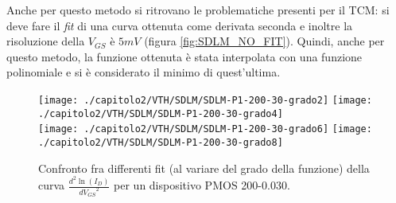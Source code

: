 Anche per questo metodo si ritrovano le problematiche presenti per il TCM: si deve fare il \textit{fit} di una curva ottenuta come derivata seconda e inoltre la risoluzione della $V_{GS}$ è $5mV$ (figura \ref{fig:SDLM_NO_FIT}).
Quindi, anche per questo metodo, la funzione ottenuta è stata interpolata con una funzione polinomiale e si è considerato il minimo di quest'ultima.

  \begin{figure}[ht]
    \centering
    \texttt{[image: ./capitolo2/VTH/SDLM/SDLM-P1-200-30-grado2]}
    \texttt{[image: ./capitolo2/VTH/SDLM/SDLM-P1-200-30-grado4]}\\
    \vspace{0.2cm}
    \texttt{[image: ./capitolo2/VTH/SDLM/SDLM-P1-200-30-grado6]}
    \texttt{[image: ./capitolo2/VTH/SDLM/SDLM-P1-200-30-grado8]}
    \caption[Confronto SDLM tra diversi fit polinomiali a diversi gradi]{Confronto fra differenti fit (al variare del grado della funzione) della curva $\frac{d^2 \ln(I_D)}{d {V_{GS}}^2}$ per un dispositivo PMOS 200-0.030.}
    \label{fig:GradiSDLM}
  \end{figure}

